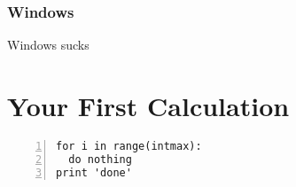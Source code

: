 \documentclass[11pt,letterpaper]{article}
\begin{document}
\subsubsection{Windows}\label{subsubsec:windows}
Windows sucks


\section{Your First Calculation}

\lstset{language=Python,alsolanguage=Custom}


\begin{lstlisting}[basicstyle=\small,keywordstyle=\color{red}\bfseries,numbers=left,numberstyle=\tiny,firstnumber=last] 
for i in range(intmax):
  do nothing
print 'done'
\end{lstlisting} 
\end{document}
